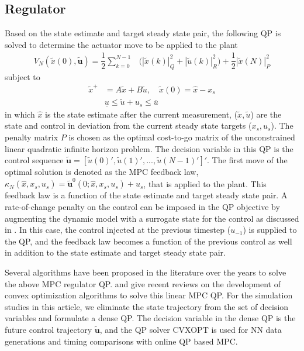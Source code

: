 \documentclass[preprint,5p, twocolumn, authoryear]{elsarticle}
\begin{document}
\subsection{Regulator}
Based on the state estimate and
target steady state pair,
the following QP is solved to determine the 
actuator move to be applied to the plant
\begin{align} \label{eqn:regulator}
    V_N(\tilde{x}(0), \mathbf{\tilde{u}}) = \dfrac{1}{2}\sum_{k=0}^{N-1} & \Big(|\tilde{x}(k)|^2_Q  + |\tilde{u}(k)|^2_R \Big) + \dfrac{1}{2}|\tilde{x}(N)|^2_P
\end{align}
subject to 
\begin{align}
    \tilde{x}^+ &= A\tilde{x} + B\tilde{u}, \quad \tilde{x}(0) = \hat{x} - x_s \\
    &\underline{u} \leq \tilde{u} + u_s \leq \overline{u}
    \label{eqn:regulator_constraints}
\end{align}
in which $\hat{x}$ is the state estimate after the current measurement,
($\tilde{x}, \tilde{u}$) are the state and control 
in deviation from the current steady state targets ($x_s, u_s$). 
The penalty matrix $P$ is chosen as the 
optimal cost-to-go matrix of the unconstrained 
linear quadratic infinite horizon problem.
The decision variable in this 
QP is the control sequence 
$\mathbf{\tilde{u}} = [\tilde{u}(0)', \tilde{u}(1)', ..., \tilde{u}(N-1)']'$.
The first move of the optimal solution is denoted 
as the MPC feedback law,
$\kappa_N(\hat{x}, x_s, u_s) = 
\mathbf{\tilde{u}}^0(0;\hat{x}, x_s, u_s) + u_s$, 
that is applied to the plant. This feedback law is a function of the 
state estimate and target steady state pair. A rate-of-change 
penalty on the control can be imposed in the QP objective
by augmenting the dynamic model with a surrogate state 
for the control as discussed in \cite*{rao:rawlings:1999}. 
In this case, 
the control injected at the previous timestep
($u_{-1}$) is supplied to the QP, 
and the feedback law becomes a function of the previous control 
as well in addition to the state estimate
and target steady state pair.

Several algorithms have been proposed in the literature over
the years to solve the above MPC regulator QP. 
\cite*{kouzoupis:frison:zanelli:diehl:2018} and
\cite*{wright:2019} give recent reviews on the development 
of convex optimization algorithms to solve this linear MPC QP.
For the simulation studies in this article, we eliminate the 
state trajectory from the set of decision variables  
and formulate a dense QP. The decision variable in the dense QP
is the future control trajectory $\mathbf{\tilde{u}}$, 
and the QP solver CVXOPT \citep*{vandenberghe:2010}
is used for NN data generations and timing 
comparisons with online QP based MPC.
\end{document}

